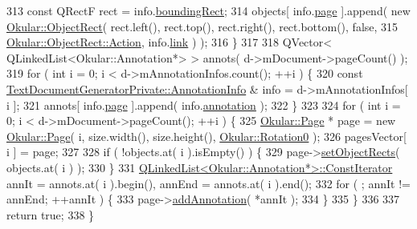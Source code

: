 \begin{DoxyCode}
313         \textcolor{keyword}{const} QRectF rect = info.\hyperlink{structOkular_1_1TextDocumentGeneratorPrivate_1_1LinkInfo_a29304f2dd84c1943c1dcec62baabc5c1}{boundingRect};
314         objects[ info.\hyperlink{structOkular_1_1TextDocumentGeneratorPrivate_1_1LinkInfo_aa123a5ca9189d3638522328da29e80b4}{page} ].append( \textcolor{keyword}{new} \hyperlink{classOkular_1_1ObjectRect}{Okular::ObjectRect}( rect.left(), rect.top(),
       rect.right(), rect.bottom(), \textcolor{keyword}{false},
315                                                              
      \hyperlink{classOkular_1_1ObjectRect_a2f77f7653306bae90bfb68277aaafe16a2ad02138861dfdc8bc2a0c29bae5bed2}{Okular::ObjectRect::Action}, info.\hyperlink{structOkular_1_1TextDocumentGeneratorPrivate_1_1LinkInfo_a1b29014996bb28edc4c5cbb4ebc45d7f}{link} ) );
316     \}
317 
318     QVector< QLinkedList<Okular::Annotation*> > annots( d->mDocument->pageCount() );
319     \textcolor{keywordflow}{for} ( \textcolor{keywordtype}{int} i = 0; i < d->mAnnotationInfos.count(); ++i ) \{
320         \textcolor{keyword}{const} \hyperlink{structOkular_1_1TextDocumentGeneratorPrivate_1_1AnnotationInfo}{TextDocumentGeneratorPrivate::AnnotationInfo} &
      info = d->mAnnotationInfos[ i ];
321         annots[ info.\hyperlink{structOkular_1_1TextDocumentGeneratorPrivate_1_1AnnotationInfo_a35a51f7a8d879d6196761cb6f34e2418}{page} ].append( info.\hyperlink{structOkular_1_1TextDocumentGeneratorPrivate_1_1AnnotationInfo_aaff9d0604ce63a1816473ecf7bcf25e8}{annotation} );
322     \}
323 
324     \textcolor{keywordflow}{for} ( \textcolor{keywordtype}{int} i = 0; i < d->mDocument->pageCount(); ++i ) \{
325         \hyperlink{classOkular_1_1Page}{Okular::Page} * page = \textcolor{keyword}{new} \hyperlink{classOkular_1_1Page}{Okular::Page}( i, size.width(), size.height(), 
      \hyperlink{namespaceOkular_a8556d00465f61ef533c6b027669e7da6aa4df8fc3dd09e30520c264c8d23d89c2}{Okular::Rotation0} );
326         pagesVector[ i ] = page;
327 
328         \textcolor{keywordflow}{if} ( !objects.at( i ).isEmpty() ) \{
329             page->\hyperlink{classOkular_1_1Page_af8c152286039a342f0b547b5efa79b9a}{setObjectRects}( objects.at( i ) );
330         \}
331         \hyperlink{classQLinkedList}{QLinkedList<Okular::Annotation*>::ConstIterator} 
      annIt = annots.at( i ).begin(), annEnd = annots.at( i ).end();
332         \textcolor{keywordflow}{for} ( ; annIt != annEnd; ++annIt ) \{
333             page->\hyperlink{classOkular_1_1Page_a8730d8d4d0072467dc9407c7fc177b8a}{addAnnotation}( *annIt );
334         \}
335     \}
336 
337     \textcolor{keywordflow}{return} \textcolor{keyword}{true};
338 \}
\end{DoxyCode}

